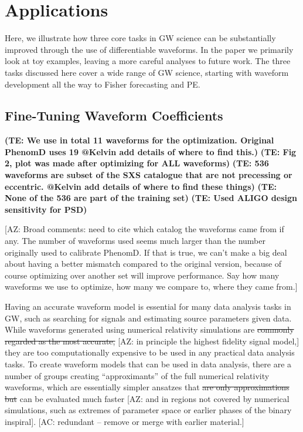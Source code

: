 \documentclass[twocolumn]{aastex631}
\newcommand{\te}[1]{\textbf{\color{pyGreen}(TE: #1)}}
\newcommand{\AZ}[1]{{\color{Burnt}[AZ: #1]}}
\newcommand{\amc}[1]{{\color{red}[AC: #1]}}
\begin{document}
\section{Applications}
\label{sec:applications}

Here, we illustrate how three core tasks in GW science can be substantially improved through the use of differentiable waveforms.
In the paper we primarily look at toy examples, leaving a more careful analyses to future work. 
The three tasks discussed here cover a wide range of GW science, starting with waveform development all the way to Fisher forecasting and PE.

\subsection{Fine-Tuning Waveform Coefficients}
\label{subsec:coeffs}

\te{We use in total 11 waveforms for the optimization. Original PhenomD uses 19 @Kelvin add details of where to find this.}
\te{Fig 2, plot was made after optimizing for ALL waveforms}
\te{536 waveforms are subset of the SXS catalogue that are not precessing or eccentric. @Kelvin add details of where to find these things}
\te{None of the 536 are part of the training set}
\te{Used ALIGO design sensitivity for PSD}

\AZ{Broad comments: need to cite which catalog the waveforms came from if any.
The number of waveforms used seems much larger than the number originally used
to calibrate PhenomD. 
If that is true, we can't make a big deal about having a better mismatch compared to
the original version, because of course optimizing over another set will improve 
performance.
Say how many waveforms we use to optimize, how many we compare to, where they came
from.}

Having an accurate waveform model is essential for many data analysis tasks in
GW, such as searching for signals and estimating source parameters given data.
While waveforms generated using numerical relativity simulations are \sout{commonly
regarded as the most accurate,} 
\AZ{in principle the highest fidelity signal model,}
they are too computationally expensive to be used
in any practical data analysis tasks. To create waveform models that can be used
in data analysis, there are a number of groups creating ``approximants'' of the
full numerical relativity waveforms, which are essentially simpler ansatzes that
\sout{are only approximations but} can be evaluated much faster \AZ{and in regions not
covered by numerical simulations, such as extremes of parameter space or earlier 
phases of the binary inspiral}. 
\amc{redundant -- remove or merge with earlier material.}
\end{document}
